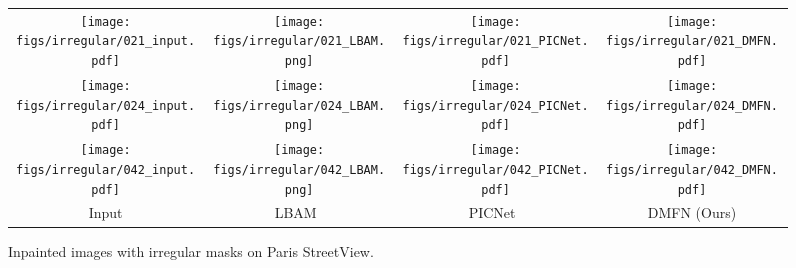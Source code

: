 \documentclass[journal]{IEEEtran}
\begin{document}
\begin{figure}[ht]
	\centering
	\begin{adjustbox}{valign=t}
		\begin{tabular}{cccc}
			
			\texttt{[image: figs/irregular/021\_input.pdf]} &
			\hspace{-4mm}
			\texttt{[image: figs/irregular/021\_LBAM.png]} &
			\hspace{-4mm}
			\texttt{[image: figs/irregular/021\_PICNet.pdf]} &
			\hspace{-4mm}
			\texttt{[image: figs/irregular/021\_DMFN.pdf]} \\
			
			
			\texttt{[image: figs/irregular/024\_input.pdf]} &
			\hspace{-4mm}
			\texttt{[image: figs/irregular/024\_LBAM.png]} &
			\hspace{-4mm}
			\texttt{[image: figs/irregular/024\_PICNet.pdf]} &
			\hspace{-4mm}
			\texttt{[image: figs/irregular/024\_DMFN.pdf]} \\
			
			
			\texttt{[image: figs/irregular/042\_input.pdf]} &
			\hspace{-4mm}
			\texttt{[image: figs/irregular/042\_LBAM.png]} &
			\hspace{-4mm}
			\texttt{[image: figs/irregular/042\_PICNet.pdf]} &
			\hspace{-4mm}
			\texttt{[image: figs/irregular/042\_DMFN.pdf]} \\
			
			
			Input &\hspace{-4mm} LBAM~\cite{LBAM} &\hspace{-4mm} PICNet~\cite{PICNet} &\hspace{-4mm} DMFN (Ours) \\
		\end{tabular}
	\end{adjustbox}
	\caption{Inpainted images with irregular masks on Paris StreetView.}
	\label{fig:irregular1}
\end{figure}
\end{document}
